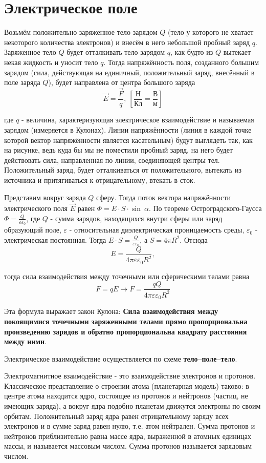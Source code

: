 \documentclass[a5paper, 10pt]{diss_4}
\renewcommand{\'}{\,'}
\begin{document}
\section{Электрическое поле}

 Возьмём положительно заряженное тело зарядом $Q$ (тело у которого не хватает
некоторого количества электронов) и внесём в него небольшой пробный заряд $q$.
Заряженное тело $Q$ будет отталкивать тело зарядом $q$, как будто из $Q$
вытекает некая жидкость и уносит тело $q$. Тогда напряжённость поля, созданного
большим зарядом (сила, действующая на единичный, положительный заряд, внесённый
в поле заряда $Q$), будет направлена от центра большого заряда
\[
\vec{E}=\frac{\vec{F}}{q},\ \left[\frac{Н}{Кл}=\frac{В}{м}\right]
\]

 где $q$ - величина, характеризующая электрическое взаимодействие и называемая
зарядом (измеряется в Кулонах). Линии напряжённости (линия в каждой точке
которой вектор напряжённости является касательным) будут выглядеть так, как на
рисунке, ведь куда бы мы не поместили пробный заряд, на него будет действовать
сила, направленная по линии, соединяющей центры тел. Положительный заряд, будет
отталкиваться от положительного, вытекать из источника и притягиваться к
отрицательному, втекать в сток.

  Представим вокруг заряда $Q$ сферу. Тогда поток вектора напряжённости
электрического поля $\vec{E}$ равен $\Phi=E\cdot S\cdot\sin\ \alpha$. По
теореме Остроградского-Гаусса $\Phi=\frac{Q}{\varepsilon\varepsilon_0}$, где
$Q$ - сумма зарядов, находящихся внутри сферы или заряд образующий поле,
$\varepsilon$ - относительная диэлектрическая проницаемость среды,
$\varepsilon_0$ - электрическая постоянная. Тогда $E\cdot
S=\frac{Q}{\varepsilon\varepsilon_0}$, а $S=4\pi R^2$. Отсюда
\[
E=\frac{Q}{4\pi\varepsilon\varepsilon_0R^2},
\]

тогда сила взаимодействия между точечными или сферическими телами равна
\[
F=qE\to
F=\frac{qQ}{4\pi\varepsilon\varepsilon_0R^2}
\]

  Эта формула выражает закон Кулона: \textbf{Сила взаимодействия между
покоящимися точечными заряженными телами прямо пропорциональна произведению
зарядов и обратно пропорциональна квадрату расстояния между ними}.

Электрическое взаимодействие осуществляется по схеме \textbf{тело--поле--тело}.

  Электромагнитное взаимодействие - это взаимодействие электронов и
протонов. Классическое представление о строении атома (планетарная модель)
таково: в центре атома находится ядро, состоящее из протонов и нейтронов
(частиц, не имеющих заряда), а вокруг ядра подобно планетам движутся электроны
по своим орбитам. Положительный заряд ядра равен отрицательному заряду всех
электронов и в сумме заряд равен нулю, т.е. атом нейтрален. Сумма протонов и
нейтронов приблизительно равна массе ядра, выраженной в атомных единицах массы,
и называется массовым числом. Сумма протонов называется зарядовым числом.
\end{document}
